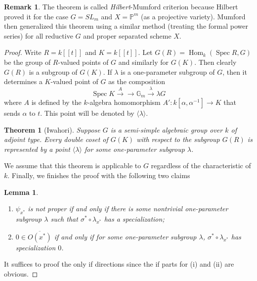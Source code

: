 \documentclass[12pt]{article}
\newtheorem{theorem}{Theorem}[section]
\newtheorem{lemma}{Lemma}[section]
\theoremstyle{remark}
\theoremstyle{definition}
\newtheorem{remark}{Remark}[section]
\newcommand{\s}[0]{\sigma}
\newcommand{\G}[0]{\mathbb{G}}
\newcommand{\Spec}[0]{\operatorname{Spec}}
\newcommand{\Hom}[0]{\operatorname{Hom}}
\begin{document}
    \begin{remark}
        The theorem is called \textit{Hilbert}-Mumford criterion because Hilbert proved it for the case $G=SL_m$ and $X=\mathbb P^m$ (as a projective variety). Mumford then generalized this theorem using a similar method (treating the formal power series) for all reductive $G$ and proper separated scheme $X$.
    \end{remark}
    \begin{proof}
        Write $R=k[[t]]$ and $K=k[[t]]$. Let $G(R)=\Hom_k(\Spec R, G)$ be the group of $R$-valued points of $G$ and similarly for $G(K)$. Then clearly $G(R)$ is a subgroup of $G(K)$. If $\lambda$ is a one-parameter subgroup of $G$, then it determines a $K$-valued point of $G$ as the composition 
        \[\Spec K\xrightarrow{A}\to \G_m\xrightarrow{\lambda} \lambda G\]
        where $A$ is defined by the $k$-algebra homomorphism $A':k[\alpha,\alpha^{-1}]\to K$ that sends $\alpha$ to $t$. This point will be denoted by $\langle\lambda\rangle$.
        \begin{theorem}[Iwahori]
            Suppose $G$ is a semi-simple algebraic group over $k$ of adjoint type. Every double coset of $G(K)$ with respect to the subgroup $G(R)$ is represented by a point $\langle\lambda\rangle$ for some one-parameter subgroup $\lambda$.
        \end{theorem}
        We assume that this theorem is applicable to $G$ regardless of the characteristic of $k$. Finally, we finishes the proof with the following two claims
        \begin{lemma}
            \begin{enumerate}[\normalfont(i)]
                \item $\psi_{x^*}$ is not proper if and only if there is some nontrivial one-parameter subgroup $\lambda$ such that $\s^*\circ\lambda_{x^*}$ has a specialization;
                \item $0\in\overline{O(x^*)}$ if and only if for some one-parameter subgroup $\lambda$, $\s^*\circ\lambda_{x^*}$ has specialization $0$.
            \end{enumerate}
        \end{lemma}
        It suffices to proof the only if directions since the if parts for (i) and (ii) are obvious.


\end{proof}
\end{document}
